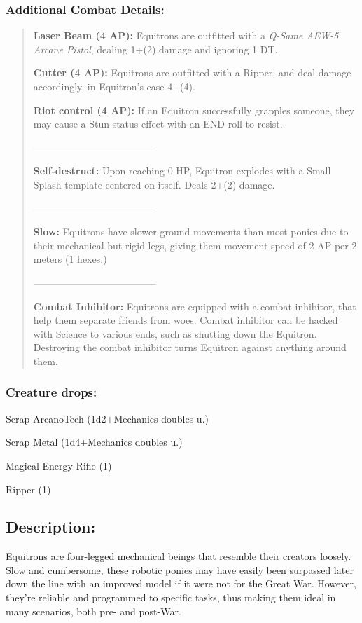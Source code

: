 \documentclass[11pt,a4paper,twocolumn]{book}
\begin{document}
	\subsubsection*{Additional Combat Details:}
	\begin{verse}
		\textbf{Laser Beam (4 AP):} Equitrons are outfitted with a \emph{Q-Same AEW-5 Arcane Pistol}, dealing 1+(2) damage and ignoring 1 DT.
		
		\textbf{Cutter (4 AP):} Equitrons are outfitted with a Ripper, and deal damage accordingly, in Equitron's case 4+(4).
		
		\textbf{Riot control (4 AP):} If an Equitron successfully grapples someone, they may cause a Stun-status effect with an END roll to resist.
		
--------------------------------------
		
		\textbf{Self-destruct:} Upon reaching 0 HP, Equitron explodes with a Small Splash template centered on itself. Deals 2+(2) damage.
		
--------------------------------------
		
		\textbf{Slow:} Equitrons have slower ground movements than most ponies due to their mechanical but rigid legs, giving them movement speed of 2 AP per 2 meters (1 hexes.)
		
--------------------------------------
		
		\textbf{Combat Inhibitor:} Equitrons are equipped with a combat inhibitor, that help them separate friends from woes. Combat inhibitor can be hacked with Science to various ends, such as shutting down the Equitron. Destroying the combat inhibitor turns Equitron against anything around them. 
		
	\end{verse}
	
	\subsubsection*{Creature drops:}
	\begin{compactitem}
		\item Scrap ArcanoTech (1d2+Mechanics doubles u.)
		\item Scrap Metal (1d4+Mechanics doubles u.)
		\item Magical Energy Rifle (1)
		\item Ripper (1)
	\end{compactitem}
	
	\subsection*{Description:}
	Equitrons are four-legged mechanical beings that resemble their creators loosely. Slow and cumbersome, these robotic ponies may have easily been surpassed later down the line with an improved model if it were not for the Great War. However, they're reliable and programmed to specific tasks, thus making them ideal in many scenarios, both pre- and post-War.
	
\end{document}
